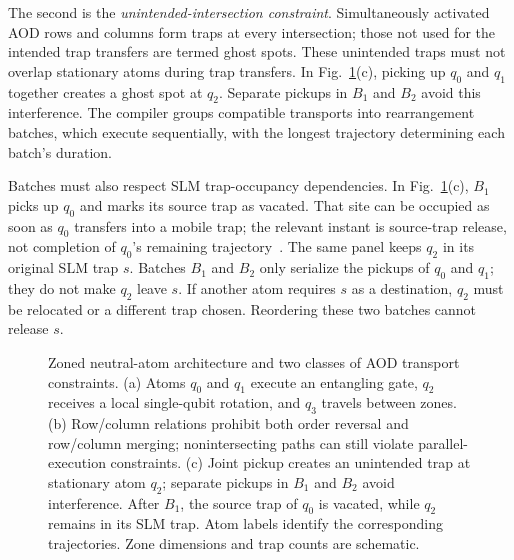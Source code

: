 The second is the \emph{unintended-intersection constraint}. Simultaneously activated AOD rows and columns form traps at every intersection; those not used for the intended trap transfers are termed ghost spots. These unintended traps must not overlap stationary atoms during trap transfers. In Fig.~\ref{fig:architecture-preliminaries}(c), picking up $q_0$ and $q_1$ together creates a ghost spot at $q_2$. Separate pickups in $B_1$ and $B_2$ avoid this interference. The compiler groups compatible transports into rearrangement batches, which execute sequentially, with the longest trajectory determining each batch's duration.

Batches must also respect SLM trap-occupancy dependencies. In Fig.~\ref{fig:architecture-preliminaries}(c), $B_1$ picks up $q_0$ and marks its source trap as vacated. That site can be occupied as soon as $q_0$ transfers into a mobile trap; the relevant instant is source-trap release, not completion of $q_0$'s remaining trajectory~\cite{lin2025zac}. The same panel keeps $q_2$ in its original SLM trap $s$. Batches $B_1$ and $B_2$ only serialize the pickups of $q_0$ and $q_1$; they do not make $q_2$ leave $s$. If another atom requires $s$ as a destination, $q_2$ must be relocated or a different trap chosen. Reordering these two batches cannot release $s$.

\begin{figure}[!t]
  \centering
  \resizebox{\textwidth}{!}{}
  \caption{Zoned neutral-atom architecture and two classes of AOD transport constraints. (a) Atoms $q_0$ and $q_1$ execute an entangling gate, $q_2$ receives a local single-qubit rotation, and $q_3$ travels between zones. (b) Row/column relations prohibit both order reversal and row/column merging; nonintersecting paths can still violate parallel-execution constraints. (c) Joint pickup creates an unintended trap at stationary atom $q_2$; separate pickups in $B_1$ and $B_2$ avoid interference. After $B_1$, the source trap of $q_0$ is vacated, while $q_2$ remains in its SLM trap. Atom labels identify the corresponding trajectories. Zone dimensions and trap counts are schematic.}
  \label{fig:architecture-preliminaries}
\end{figure}

